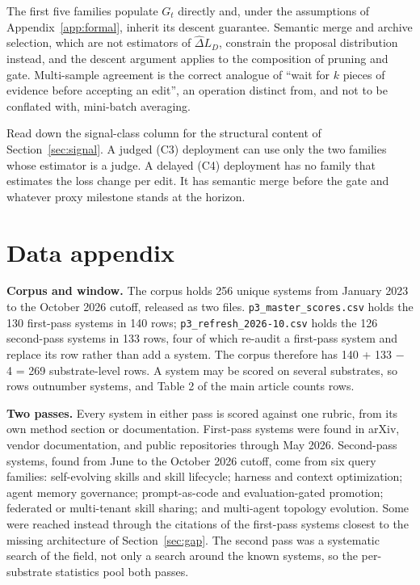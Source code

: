 \documentclass[
  11pt,
]{article}
\begin{document}
The first five families populate \(G_t\) directly and, under the assumptions of Appendix~\ref{app:formal}, inherit its descent guarantee. Semantic merge and archive selection, which are not estimators of \(\widehat{\Delta} L_D\), constrain the proposal distribution instead, and the descent argument applies to the composition of pruning and gate. Multi-sample agreement is the correct analogue of ``wait for \(k\) pieces of evidence before accepting an edit'', an operation distinct from, and not to be conflated with, mini-batch averaging.

Read down the signal-class column for the structural content of Section~\ref{sec:signal}. A judged (C3) deployment can use only the two families whose estimator is a judge. A delayed (C4) deployment has no family that estimates the loss change per edit. It has semantic merge before the gate and whatever proxy milestone stands at the horizon.

\section{Data appendix}\label{app:data}

\textbf{Corpus and window.} The corpus holds 256 unique systems from January 2023 to the October 2026 cutoff, released as two files. \texttt{p3\_master\_scores.csv} holds the 130 first-pass systems in 140 rows; \texttt{p3\_refresh\_2026-10.csv} holds the 126 second-pass systems in 133 rows, four of which re-audit a first-pass system and replace its row rather than add a system. The corpus therefore has 140 + 133 − 4 = 269 substrate-level rows. A system may be scored on several substrates, so rows outnumber systems, and Table 2 of the main article counts rows.

\textbf{Two passes.} Every system in either pass is scored against one rubric, from its own method section or documentation. First-pass systems were found in arXiv, vendor documentation, and public repositories through May 2026. Second-pass systems, found from June to the October 2026 cutoff, come from six query families: self-evolving skills and skill lifecycle; harness and context optimization; agent memory governance; prompt-as-code and evaluation-gated promotion; federated or multi-tenant skill sharing; and multi-agent topology evolution. Some were reached instead through the citations of the first-pass systems closest to the missing architecture of Section~\ref{sec:gap}. The second pass was a systematic search of the field, not only a search around the known systems, so the per-substrate statistics pool both passes.
\end{document}

